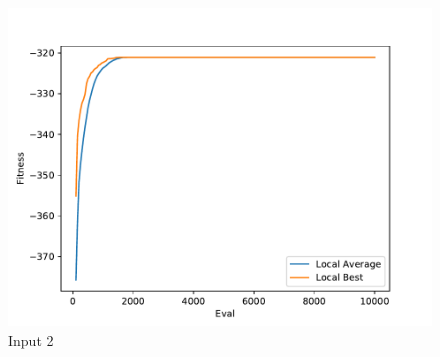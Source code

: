 \documentclass{standalone}
\begin{document}
\begin{figure}[!htb]
	\caption{Input 2}
	\label{fig:graph_2053}
	\includegraphics[width=\textwidth]{../graphs/graphs/2053.pdf}
\end{figure}
\end{document}
